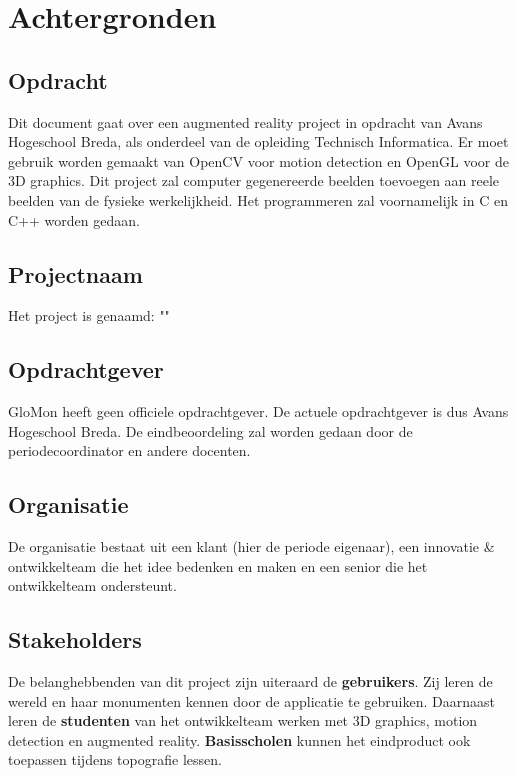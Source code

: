 
\chapter{Achtergronden} \label{cha:achtergrond}

\section{Opdracht} \label{sec:opdracht}

Dit document gaat over een augmented reality project in opdracht van Avans Hogeschool Breda, als onderdeel van de opleiding Technisch Informatica. Er moet gebruik worden gemaakt van OpenCV voor motion detection en OpenGL voor de 3D graphics. Dit project zal computer gegenereerde beelden toevoegen aan reele beelden van de fysieke werkelijkheid. Het programmeren zal voornamelijk in C en C++ worden gedaan.

\section{Projectnaam} \label{sec:projectnaam}
Het project is genaamd: "\projectname"

\section{Opdrachtgever} \label{sec:opdrachtgever}
GloMon heeft geen officiele opdrachtgever. De actuele opdrachtgever is dus Avans Hogeschool Breda. De eindbeoordeling zal worden gedaan door de periodecoordinator en andere docenten.

\section{Organisatie} \label{sec:organisatie}
De organisatie bestaat uit een klant (hier de periode eigenaar), een innovatie & ontwikkelteam die het idee bedenken en maken en een senior die het ontwikkelteam ondersteunt.

\section{Stakeholders} \label{sec:stakeholders}
De belanghebbenden van dit project zijn uiteraard de \textbf{gebruikers}. Zij leren de wereld en haar monumenten kennen door de applicatie te gebruiken. Daarnaast leren de \textbf{studenten} van het ontwikkelteam werken met 3D graphics, motion detection en augmented reality. \textbf{Basisscholen} kunnen het eindproduct ook toepassen tijdens topografie lessen.

